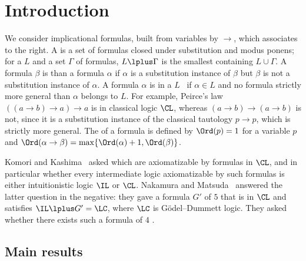 \section{Introduction}\label{sec:intro}

We consider implicational formulas, built from variables by $\to$, which
associates to the right. A  is a set of formulas closed under
substitution and modus ponens; for a  $L$ and a set $\Gamma$ of
formulas, $L\lplus\Gamma$ is the smallest  containing
$L\cup\Gamma$. A formula $\beta$ is  than a formula
$\alpha$ if $\alpha$ is a substitution instance of $\beta$ but $\beta$ is
not a substitution instance of $\alpha$. A formula $\alpha$ is 
in a  $L$~\cite{Kom05} if $\alpha\in L$ and no formula strictly
more general than $\alpha$ belongs to $L$. For example, Peirce's law
$((a\to b)\to a)\to a$ is  in classical logic $\CL$, whereas
$(a\to b)\to(a\to b)$ is not, since it is a substitution instance of the
classical tautology $p\to p$, which is strictly more general. The
 of a formula is defined by $\Ord(p)=1$ for a variable $p$ and
$\Ord(\alpha\to\beta)=\max\{\Ord(\alpha)+1,\Ord(\beta)\}$.

Komori and Kashima~\cite{Kom05,Kas05} asked which  are
axiomatizable by formulas  in $\CL$, and in particular whether
every intermediate logic axiomatizable by such formulas is either
intuitionistic logic $\IL$ or $\CL$. Nakamura and Matsuda~\cite{NM21}
answered the latter question in the negative: they gave a formula $G'$ of
 $5$ that is  in $\CL$ and satisfies
$\IL\lplus G'=\LC$, where $\LC$ is Gödel--Dummett logic. They asked whether
there exists such a formula of  $4$ \cite[Open Problem~2]{NM21}.

\subsection{Main results}


